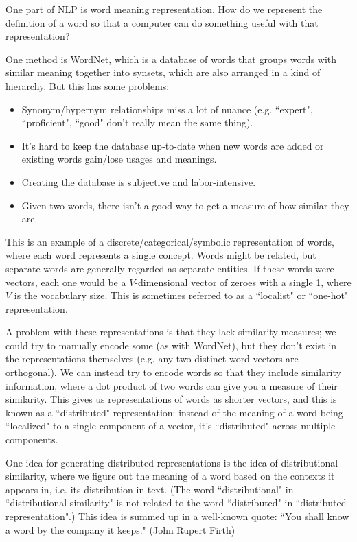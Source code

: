 One part of NLP is word meaning representation. How do we represent the definition of a word so that a computer can do something useful with that representation?

One method is WordNet, which is a database of words that groups words with similar meaning together into synsets, which are also arranged in a kind of hierarchy. But this has some problems:
\begin{itemize}
\item Synonym/hypernym relationships miss a lot of nuance (e.g. ``expert", ``proficient", ``good" don't really mean the same thing).
\item It's hard to keep the database up-to-date when new words are added or existing words gain/lose usages and meanings.
\item Creating the database is subjective and labor-intensive.
\item Given two words, there isn't a good way to get a measure of how similar they are.
\end{itemize}
This is an example of a discrete/categorical/symbolic representation of words, where each word represents a single concept. Words might be related, but separate words are generally regarded as separate entities. If these words were vectors, each one would be a $V$-dimensional vector of zeroes with a single 1, where $V$ is the vocabulary size. This is sometimes referred to as a ``localist" or ``one-hot" representation.

A problem with these representations is that they lack similarity measures; we could try to manually encode some (as with WordNet), but they don't exist in the representations themselves (e.g. any two distinct word vectors are orthogonal). We can instead try to encode words so that they include similarity information, where a dot product of two words can give you a measure of their similarity. This gives us representations of words as shorter vectors, and this is known as a ``distributed" representation: instead of the meaning of a word being ``localized" to a single component of a vector, it's ``distributed" across multiple components.

One idea for generating distributed representations is the idea of distributional similarity, where we figure out the meaning of a word based on the contexts it appears in, i.e. its distribution in text. (The word ``distributional" in ``distributional similarity" is not related to the word ``distributed" in ``distributed representation".) This idea is summed up in a well-known quote: ``You shall know a word by the company it keeps." (John Rupert Firth)

